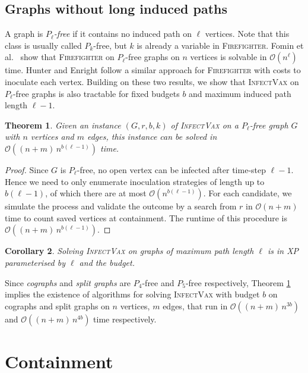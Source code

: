 \documentclass[unknownkeysallowed]{article}
\newtheorem{theorem}{Theorem}[section]
\newtheorem{corollary}[theorem]{Corollary}
\theoremstyle{definition}\newtheorem{strategy}{Strategy}
\theoremstyle{definition}\newtheorem{notation}{Notation}[theorem]
\newcommand*{\Fire}{\textup{\textsc{Firefighter}}\xspace} %
\newcommand*{\IV}{\textup{\textsc{InfectVax}}\xspace}
\begin{document}
\subsection{Graphs without long induced paths}
\label{sec:bounded-path-length}

A graph is \emph{$P_\ell$-free} if it contains no induced path on $\ell$ vertices.  Note that this class is usually called $P_k$-free, but $k$ is already a variable in \Fire.  Fomin et al.\ \cite{fomin_2016} show that \Fire on $P_\ell$-free graphs on $n$ vertices is solvable in $\mathcal{O}(n^\ell)$ time. Hunter and Enright \cite{hunter_2024} follow a similar approach for \Fire with costs to inoculate each vertex. Building on these two results, we show that \IV on $P_\ell$-free graphs is also tractable for fixed budgets $b$ and maximum induced path length $\ell-1$.

\begin{theorem} 
Given an instance $(G,r,b,k)$ of \IV on a $P_{\ell}$-free graph $G$ with $n$ vertices and $m$ edges, this instance can be solved in $\mathcal{O}((n+m)\,n^{b(\ell-1)})$ time.
  \label{thm:iv-pk-free}
\end{theorem}

\begin{proof}
Since $G$ is $P_\ell$-free, no open vertex can be infected after time-step $\ell-1$. Hence we need to only enumerate inoculation strategies of length up to $b(\ell-1)$, of which there are at most $\mathcal{O}(n^{b(\ell-1)})$. For each candidate, we simulate the process and validate the outcome by a search from $r$ in $\mathcal{O}(n+m)$ time to count saved vertices at containment. The runtime of this procedure is $\mathcal{O}((n+m)\,n^{b(\ell-1)})$.
\end{proof}

\begin{corollary}\label{cor:bounded-poly}
  Solving \IV on graphs of maximum path length $\ell$ is in XP parameterised by $\ell$ and the budget.
\end{corollary}

Since \emph{cographs} and \emph{split graphs} are $P_4$-free and $P_5$-free respectively, Theorem \ref{thm:iv-pk-free} implies the existence of algorithms for solving \IV with budget $b$ on cographs and split graphs on $n$ vertices, $m$ edges, that run in $\mathcal{O}((n+m)\,n^{3b})$ and $\mathcal{O}((n+m)\,n^{4b})$ time respectively.



\section{Containment}
\label{sec:contain}
\end{document}

